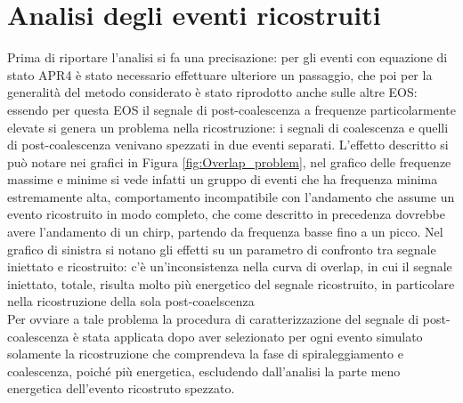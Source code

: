 \section{Analisi degli eventi ricostruiti}
\label{section:overlap}
Prima di riportare l'analisi si fa una precisazione: per gli eventi con equazione di stato APR4 è stato necessario effettuare ulteriore un passaggio, che poi per la generalità del metodo considerato è stato riprodotto anche sulle altre EOS: essendo per questa EOS il segnale di post-coalescenza a frequenze particolarmente elevate si genera un problema nella ricostruzione: i segnali di coalescenza e quelli di post-coalescenza venivano spezzati in due eventi separati. L'effetto descritto si può notare nei grafici in Figura \ref{fig:Overlap_problem}, nel grafico delle frequenze massime e minime si vede infatti un gruppo di eventi che ha frequenza minima estremamente alta, comportamento incompatibile con l'andamento che assume un evento ricostruito in modo completo, che come descritto in precedenza dovrebbe avere l'andamento di un chirp, partendo da frequenza basse fino a un picco. Nel grafico di sinistra si notano gli effetti su un parametro di confronto tra segnale iniettato e ricostruito: c'è un'inconsistenza nella curva di overlap, in cui il segnale iniettato, totale, risulta molto più energetico del segnale ricostruito, in particolare nella ricostruzione della sola post-coaelscenza \\
Per ovviare a tale problema la procedura di caratterizzazione del segnale di post-coalescenza è stata applicata dopo aver selezionato per ogni evento simulato solamente la ricostruzione che comprendeva la fase di spiraleggiamento e coalescenza, poiché più energetica, escludendo dall'analisi la parte meno energetica dell'evento ricostruto spezzato.
